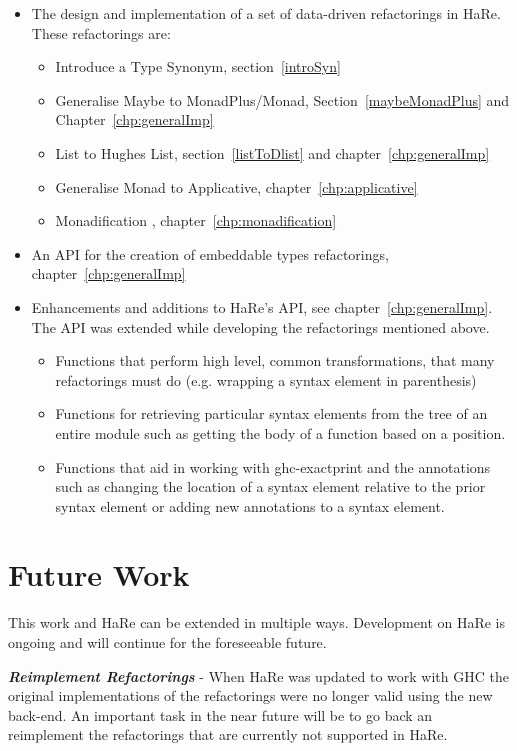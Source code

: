 \begin{itemize}
\item The design and implementation of a set of data-driven refactorings in HaRe. These refactorings are:
	\begin{itemize}
		\item Introduce a Type Synonym, section~\ref{introSyn}
		\item Generalise Maybe to MonadPlus/Monad, Section~\ref{maybeMonadPlus} and Chapter~\ref{chp:generalImp}
		\item List to Hughes List, section~\ref{listToDlist} and chapter~\ref{chp:generalImp}
		\item Generalise Monad to Applicative, chapter~\ref{chp:applicative}
		\item Monadification	, chapter~\ref{chp:monadification}	
	\end{itemize}
\item An API for the creation of embeddable types refactorings, chapter~\ref{chp:generalImp}
\item Enhancements and additions to HaRe's API, see chapter~\ref{chp:generalImp}. The API was extended while developing the refactorings mentioned above.
\begin{itemize}
	\item Functions that perform high level, common transformations, that many refactorings must do (e.g. wrapping a syntax element in parenthesis)
	\item Functions for retrieving particular syntax elements from the tree of an entire module such as getting the body of a function based on a position.
	\item Functions that aid in working with ghc-exactprint and the annotations such as changing the location of a syntax element relative to the prior syntax element or adding new annotations to a syntax element.
\end{itemize}	  
\end{itemize}
\section{Future Work}
This work and HaRe can be extended in multiple ways. Development on HaRe is ongoing and will continue for the foreseeable future. 

\textit{\textbf{Reimplement Refactorings}} - When HaRe was updated to work with GHC the original implementations of the refactorings were no longer valid using the new back-end. An important task in the near future will be to go back an reimplement the refactorings that are currently not supported in HaRe.  

